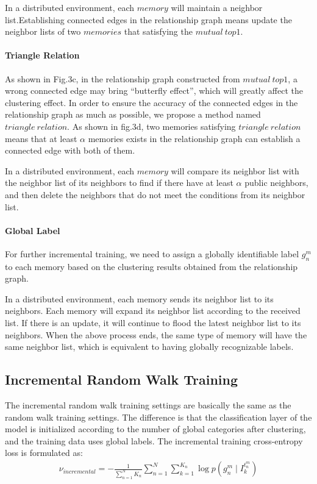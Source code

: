 \documentclass{article}
\begin{document}
In a distributed environment, each $memory$ will maintain a neighbor list.Establishing connected edges in the relationship graph means update the neighbor lists of two $memories$ that satisfying the $mutual \ top1$.

\paragraph{Triangle Relation}As shown in Fig.3c, in the relationship graph constructed from $mutual \ top1$, a wrong connected edge may bring ``butterfly effect'', which will greatly affect the clustering effect. In order to ensure the accuracy of the connected edges in the relationship graph as much as possible, we propose a  method named $triangle \ relation$. As shown in fig.3d, two memories satisfying $triangle \ relation$ means that at least $\alpha$ memories exists in the relationship graph can establish a connected edge with both of them. 


In a distributed environment, each $memory$ will compare its neighbor list with the neighbor list of its neighbors to find if there have at least $\alpha$ public neighbors, and then delete the neighbors that do not meet the conditions from its neighbor list.

\paragraph{Global Label}For further incremental training, we need to assign a globally identifiable label $g_{n}^{m}$ to each memory based on the clustering results obtained from the relationship graph.


In a distributed environment, each memory sends its neighbor list to its neighbors. Each memory will expand its neighbor list according to the received list. If there is an update, it will continue to flood the latest neighbor list to its neighbors. When the above process ends, the same type of memory will have the same neighbor list, which is equivalent to having globally recognizable labels.

\subsection{Incremental Random Walk Training}
The incremental random walk training settings are basically the same as the random walk training settings. The difference is that the classification layer of the model is initialized according to the number of global categories after clustering, and the training data uses global labels. The incremental training cross-entropy loss is formulated as:
\begin{equation}
\begin{aligned}
    \nu _{incremental}=-\frac{1}{\sum_{n=1}^{N} K_{n}}\sum_{n=1}^{N}\sum_{k=1}^{K_{n}}\log p(g_{n}^{m}\mid I_{k}^{t_{n}^{m}})
\end{aligned}
\end{equation}
\end{document}
